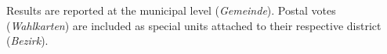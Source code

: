 Results are reported at the municipal level (\emph{Gemeinde}).  Postal votes (\textit{Wahlkarten}) are included as
special units attached to their respective district (\textit{Bezirk}).